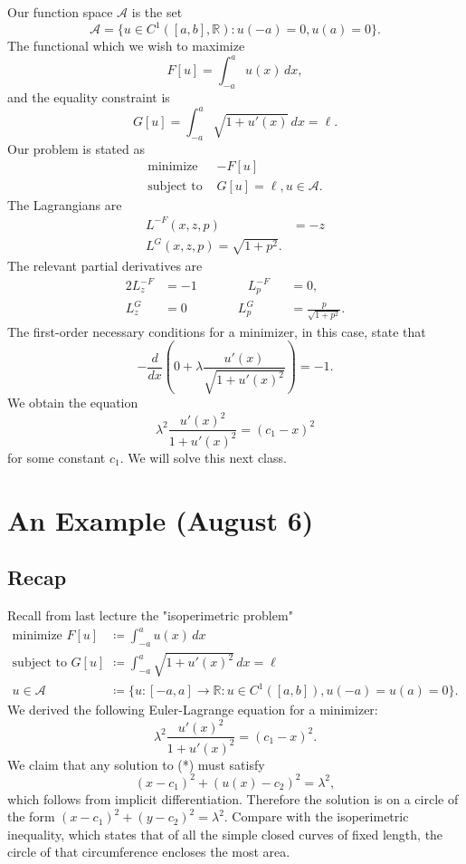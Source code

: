 \documentclass[11pt]{book}
\newcommand{\R}{\mathbb{R}}
\begin{document}
Our function space $\mathcal{A}$ is the set
\[
\mathcal{A} = \{ u \in C^1([a,b], \R) : u(-a) = 0, u(a) = 0 \}.
\]
The functional which we wish to maximize
\[
F[u] = \int_{-a}^a u(x) \, dx,
\]
and the equality constraint is
\[
G[u] = \int_{-a}^a \sqrt{1 + u'(x)} \, dx = \ell.
\]
Our problem is stated as
\begin{align*}
\text{minimize } &-F[u] \\
\text{subject to } & G[u] = \ell, u \in \mathcal{A}.
\end{align*}
The Lagrangians are
\begin{align*}
L^{-F}(x,z,p) &= -z \\
L^G(x,z,p) = \sqrt{1 + p^2}.
\end{align*}
The relevant partial derivatives are
\begin{alignat*}{2}
L^{-F}_z &= -1 \qquad\qquad L^{-F}_p &&= 0, \\
L^G_z &= 0 \qquad\qquad L^G_p &&= \frac{p}{\sqrt{1 + p^2}}.
\end{alignat*}
The first-order necessary conditions for a minimizer, in this case, state that
\[
-\frac{d}{dx} \left( 0 + \lambda \frac{u'(x)}{\sqrt{1 + u'(x)^2}} \right) = -1.
\]
We obtain the equation
\[
\lambda^2 \frac{u'(x)^2}{1 + u'(x)^2} = (c_1 - x)^2
\]
for some constant $c_1$. We will solve this next class.

\newpage

\section{An Example (August 6)}

\subsection{Recap}

Recall from last lecture the "isoperimetric problem"
\begin{align*}
\text{minimize } F[u] &\coloneqq \int_{-a}^a u(x) \, dx \\
\text{subject to } G[u] &\coloneqq \int_{-a}^a \sqrt{1 + u'(x)^2} \, dx = \ell \\
u \in \mathcal{A} &\coloneqq \{ u : [-a, a] \to \R : u \in C^1([a,b]), u(-a) = u(a) = 0 \}.
\end{align*}
We derived the following Euler-Lagrange equation for a minimizer:
\[
\tag{*}
\lambda^2 \frac{u'(x)^2}{1 + u'(x)^2} = (c_1 - x)^2.
\]
We claim that any solution to (*) must satisfy
\[
(x - c_1)^2 + (u(x) - c_2)^2 = \lambda^2,
\]
which follows from implicit differentiation. Therefore the solution is on a circle of the form $(x - c_1)^2 + (y - c_2)^2 = \lambda^2$. Compare with the isoperimetric inequality, which states that of all the simple closed curves of fixed length, the circle of that circumference encloses the most area.
\end{document}
